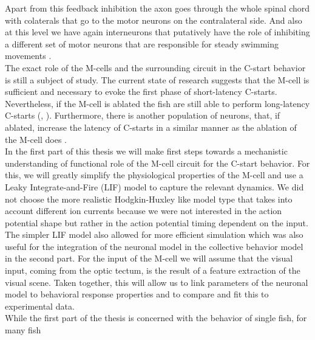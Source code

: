 \documentclass[a4paper,10pt,hidelinks]{scrreprt}
\begin{document}
	Apart from this feedback inhibition the axon goes through the whole spinal chord with 
	colaterals that go to the motor neurons on the contralateral side.
	And also at this level we have again interneurons that putatively have the role of inhibiting a 
	different set of motor neurons that are responsible for steady swimming movements 
	\citep{Song2015}.\\
	The exact role of the M-cells and the surrounding circuit in the C-start behavior is still a 
	subject of study.
	The current state of research suggests that the M-cell is sufficient and necessary to evoke 
	the first phase of short-latency C-starts.
	Nevertheless, if the M-cell is ablated the fish are still able to perform long-latency C-starts 
	(\cite{Lacoste2015}, \cite{Dunn2016}).
	Furthermore, there is another population of neurons, that, if ablated, increase the latency of 
	C-starts in a similar manner as the ablation of the M-cell does \citep{Lacoste2015}.\\
	In the first part of this thesis we will make first steps towards a mechanistic understanding 
	of 
	functional role of the M-cell circuit for the C-start behavior.
	For this, we will greatly simplify the physiological properties of the M-cell and use a Leaky 
	Integrate-and-Fire (LIF) model to capture the relevant dynamics.
	We did not choose the more realistic Hodgkin-Huxley like model type that takes into account 
	different ion currents because we were not interested in the action potential shape but rather 
	in 
	the action potential timing dependent on the input.
	The simpler LIF model also allowed for more efficient simulation which was also useful for the 
	integration of the neuronal model in the collective behavior model in the second part.
	For the input of the M-cell we will assume that the visual input, coming from the optic tectum, 
	is the result of a feature extraction of the visual scene.
	Taken together, this will allow us to link parameters of the neuronal model to behavioral 
	response properties and to compare and fit this to experimental data.\\
	While the first part of the thesis is concerned with the behavior of single fish, for many fish 
\end{document}
